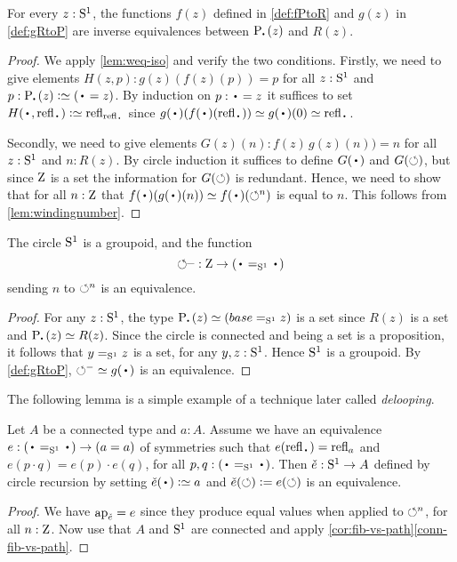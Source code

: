 \begin{lemma}
  \label{lem:univisexp}
For every $z:{\mathrm{S}^1}$, the functions $f(z)$ defined in \cref{def:fPtoR} 
and $g(z)$ in \cref{def:gRtoP} are inverse equivalences between
$\uc{\base}(z)$ and $R(z)$.
\end{lemma}
\begin{proof}
We apply \cref{lem:weq-iso} and verify the two conditions.
  Firstly, we need to give elements $H(z,p):g(z)(f(z)(p))=p$
for all $z:{\mathrm{S}^1}$ and $p:\uc{\base}(z)\defeq(\base=z)$. 
By induction on $p:\base=z$ it suffices to set 
$H(\base,\refl\base)\defeq\refl{\refl{\base}}$ since
$g(\base)(f(\base)(\refl{\base}))\jdeq g(\base)(0)\jdeq\refl{\base}$.

Secondly, we need to give elements $G(z)(n):f(z)\,g(z)(n))=n$
for all $z:{\mathrm{S}^1}$ and $n: R(z)$.
By circle induction it suffices to define $G(\base)$ and $G(\circlearrowleft)$,
but since $\mathrm{Z}$ is a set the information for $G(\circlearrowleft)$ is redundant.
Hence, we need to show that for all $n:\mathrm{Z}$ that 
$f(\base)(g(\base)(n))\jdeq  f(\base)(\Sloop^n)$ is equal to $n$.  
This follows from \cref{lem:windingnumber}. 
\end{proof}


\begin{corollary}\label{cor:S1groupoid}
The circle ${\mathrm{S}^1}$ is a groupoid, and the function
\[
{\Sloop}^{\blank} : \zet\to(\base=_{\Sc}\base)
\]
sending $n$ to $\circlearrowleft^n$ is an equivalence.
\end{corollary}
\begin{proof}
For any $z:{\mathrm{S}^1}$, the type $\uc{\base}(z)\jdeq (base=_{\Sc}z)$ is a set 
since $R(z)$ is a set and $\uc{\base}(z) \equiv R(z)$.
Since the circle is connected and being a set is a proposition, it follows
that $y=_{{\mathrm{S}^1}}z$ is a set, for any $y,z:{\mathrm{S}^1}$. Hence ${\mathrm{S}^1}$ is a groupoid.
By \cref{def:gRtoP}, ${\Sloop}^{-}\jdeq g(\base)$ is an equivalence.
\end{proof}

The following lemma is a simple example of a technique later called \emph{delooping}.
\begin{lemma}\label{lem:S1-delooping}
Let $A$ be a connected type and $a:A$. 
Assume we have an equivalence $e:(\base=_{\Sc}\base) \to (a=a)$
of symmetries such that $e(\refl{\base})=\refl{a}$
and $e(p\cdot q)=e(p)\cdot e(q)$, for all $p,q:(\base=_{\Sc}\base)$.
Then $\check e : {\mathrm{S}^1}\to A$ defined by circle recursion by setting
$\check e(\base)\defeq a$ and $\check e(\circlearrowleft)\mathrel{\vcentcolon=} e(\circlearrowleft)$
is an equivalence.
\end{lemma}
\begin{proof}
We have $\ap{\check e} = e$ since they produce equal values when applied
to $\circlearrowleft^n$, for all $n:\mathrm{Z}$. Now use that $A$ and ${\mathrm{S}^1}$ are connected and
apply \cref{cor:fib-vs-path}\ref{conn-fib-vs-path}.
\end{proof}

